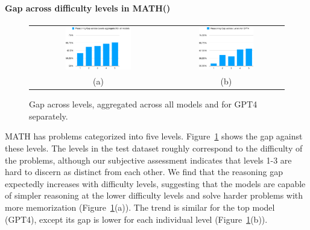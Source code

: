 \documentclass[11pt,a4paper]{article}
\begin{document}
\paragraph{Gap across difficulty levels in MATH()}
\begin{figure}
  \begin{tabular}{cc}
    \includegraphics[width=0.5\textwidth]{all-levels} &
    \includegraphics[width=0.5\textwidth]{gpt4-levels}\\
    (a) & (b)
  \end{tabular}
  \caption{\label{fig:gap-levels} Gap across levels, aggregated across all models and for GPT4 separately.}
\end{figure}
MATH has problems categorized into five levels.  Figure~\ref{fig:gap-levels}
shows the gap against these levels. The levels in the test dataset roughly
correspond to the difficulty of the problems, although our subjective
assessment indicates that levels 1-3 are hard to discern as distinct from each
other.  We find that the reasoning gap expectedly increases with difficulty
levels, suggesting that the models are capable of simpler reasoning at the
lower difficulty levels and solve harder problems with more memorization
(Figure~\ref{fig:gap-levels}(a)).  The trend is similar for the top model
(GPT4), except its gap is lower for each individual level
(Figure~\ref{fig:gap-levels}(b)).
\end{document}
